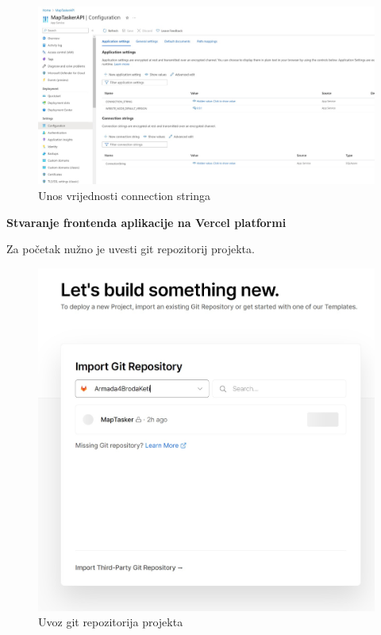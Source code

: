 		\begin{figure}[H]
			 \includegraphics[width=\linewidth]{./slike/backend2.jpg}
			  \centering
			  \caption{Unos vrijednosti connection stringa}
		  \end{figure}
		
		\vspace{30mm}

		\noindent\textbf{Stvaranje frontenda aplikacije na Vercel platformi}

		\noindent Za početak nužno je uvesti git repozitorij projekta.

		\vspace{10mm}

		\begin{figure}[H]
			 \includegraphics[width=\linewidth]{./slike/front1.jpg}
			  \centering
			  \caption{Uvoz git repozitorija projekta}
		  \end{figure}

